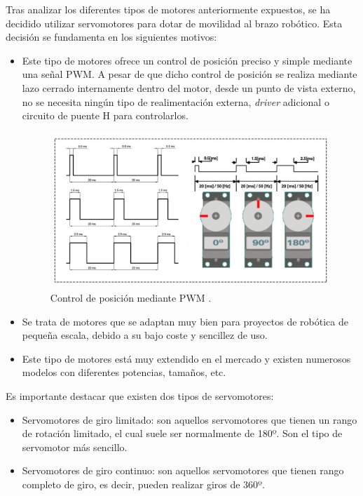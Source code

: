 Tras analizar los diferentes tipos de motores anteriormente expuestos, se ha decidido utilizar servomotores para dotar de movilidad al brazo robótico. Esta decisión se fundamenta en los siguientes motivos:
\begin{itemize}
    \item Este tipo de motores ofrece un control de posición preciso y simple mediante una señal \ac{PWM}. A pesar de que dicho control de posición se realiza mediante lazo cerrado internamente dentro del motor, desde un punto de vista externo, no se necesita ningún tipo de realimentación externa, \textit{driver} adicional o circuito de puente H para controlarlos.
    
    \begin{figure}[h!]
    \centering 
    \includegraphics[width=.6\linewidth]{pictures/Senal_PWM.jpg}
    \caption{Control de posición mediante PWM \cite{noauthor_zona_nodate}.}
    \label{fig:}
    \end{figure}

    
    \item Se trata de motores que se adaptan muy bien para proyectos de robótica de pequeña escala, debido a su bajo coste y sencillez de uso.
    
    \item Este tipo de motores está muy extendido en el mercado y existen numerosos modelos con diferentes potencias, tamaños, etc.
\end{itemize}

Es importante destacar que existen dos tipos de servomotores:
\begin{itemize}
    \item Servomotores de giro limitado: son aquellos servomotores que tienen un rango de rotación limitado, el cual suele ser normalmente de 180º. Son el tipo de servomotor más sencillo.
    \item Servomotores de giro continuo: son aquellos servomotores que tienen rango completo de giro, es decir, pueden realizar giros de 360º.
\end{itemize}

